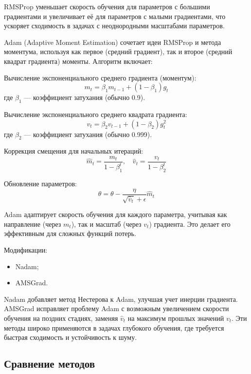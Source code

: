 \documentclass[11pt,a4paper]{article}
\begin{document}
RMSProp уменьшает скорость обучения для параметров с большими градиентами и увеличивает её для параметров с малыми градиентами, что ускоряет сходимость в задачах с неоднородными масштабами параметров.

Adam (Adaptive Moment Estimation) сочетает идеи RMSProp и метода моментума, используя как первое (средний градиент), так и второе (средний квадрат градиента) моменты. Алгоритм включает:

Вычисление экспоненциального среднего градиента (моментум):
\begin{equation}
m_t = \beta_1 m_{t-1} + (1 - \beta_1) g_t
\end{equation}
где \( \beta_1 \) — коэффициент затухания (обычно 0.9).

Вычисление экспоненциального среднего квадрата градиента:
\begin{equation}
v_t = \beta_2 v_{t-1} + (1 - \beta_2) g_t^2
\end{equation}
где \( \beta_2 \) — коэффициент затухания (обычно 0.999).

Коррекция смещения для начальных итераций:
\begin{equation}
\hat{m}_t = \frac{m_t}{1 - \beta_1^t}, \quad \hat{v}_t = \frac{v_t}{1 - \beta_2^t}
\end{equation}

Обновление параметров:
\begin{equation}
\theta = \theta - \frac{\eta}{\sqrt{\hat{v}_t} + \epsilon} \hat{m}_t
\end{equation}

Adam адаптирует скорость обучения для каждого параметра, учитывая как направление (через \( m_t \)), так и масштаб (через \( v_t \)) градиента. Это делает его эффективным для сложных функций потерь.

Модификации:
\begin{itemize}[label=--]
    \item Nadam;
    \item AMSGrad.
\end{itemize}

Nadam добавляет метод Нестерова к Adam, улучшая учет инерции градиента. AMSGrad исправляет проблему Adam с возможным увеличением скорости обучения на поздних стадиях, заменяя \( \hat{v}_t \) на максимум прошлых значений \( v_t \). Эти методы широко применяются в задачах глубокого обучения, где требуется быстрая сходимость и устойчивость к шуму.

\subsection{Сравнение методов}
\end{document}
